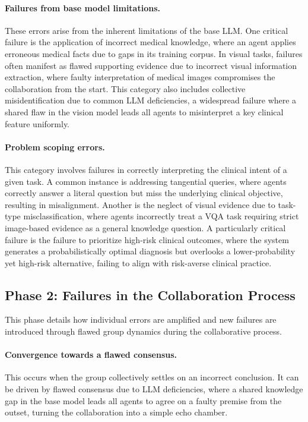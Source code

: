 \paragraph{Failures from base model limitations.}
These errors arise from the inherent limitations of the base LLM. One critical failure is the application of incorrect medical knowledge, where an agent applies erroneous medical facts due to gaps in its training corpus. In visual tasks, failures often manifest as flawed supporting evidence due to incorrect visual information extraction, where faulty interpretation of medical images compromises the collaboration from the start. This category also includes collective misidentification due to common LLM deficiencies, a widespread failure where a shared flaw in the vision model leads all agents to misinterpret a key clinical feature uniformly.

\paragraph{Problem scoping errors.}
This category involves failures in correctly interpreting the clinical intent of a given task. A common instance is addressing tangential queries, where agents correctly answer a literal question but miss the underlying clinical objective, resulting in misalignment. Another is the neglect of visual evidence due to task-type misclassification, where agents incorrectly treat a VQA task requiring strict image-based evidence as a general knowledge question. A particularly critical failure is the failure to prioritize high-risk clinical outcomes, where the system generates a probabilistically optimal diagnosis but overlooks a lower-probability yet high-risk alternative, failing to align with risk-averse clinical practice.

\subsection{Phase 2: Failures in the Collaboration Process}
This phase details how individual errors are amplified and new failures are introduced through flawed group dynamics during the collaborative process.

\paragraph{Convergence towards a flawed consensus.}
This occurs when the group collectively settles on an incorrect conclusion. It can be driven by flawed consensus due to LLM deficiencies, where a shared knowledge gap in the base model leads all agents to agree on a faulty premise from the outset, turning the collaboration into a simple echo chamber.

